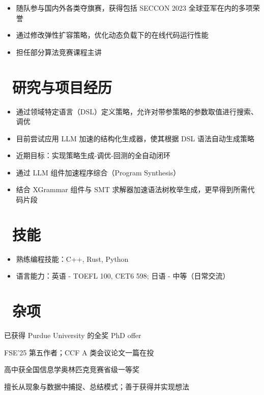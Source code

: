 \documentclass{compact_resume}
\begin{document}
\begin{itemize}[parsep=0.5ex]
  \item 随队参与国内外各类夺旗赛，获得包括 SECCON 2023 全球亚军在内的多项荣誉
\end{itemize}

\begin{itemize}[parsep=0.5ex]
  \item 通过修改弹性扩容策略，优化动态负载下的在线代码运行性能
  \item 担任部分算法竞赛课程主讲
\end{itemize}

\section{\faCogs\ 研究与项目经历}

\begin{itemize}[parsep=0.5ex]
  \item 通过领域特定语言（DSL）定义策略，允许对带参策略的参数取值进行搜索、调优
  \item 目前尝试应用 LLM 加速的结构化生成器，使其根据 DSL 语法自动生成策略
  \item 近期目标：实现策略生成-调优-回测的全自动闭环
\end{itemize}

\begin{itemize}[parsep=0.5ex]
  \item 通过 LLM 组件加速程序综合（Program Synthesis）
  \item 结合 XGrammar 组件与 SMT 求解器加速语法树枚举生成，更早得到所需代码片段
\end{itemize}

\section{\faCogs\ 技能}
\begin{itemize}[parsep=0.5ex]
  \item 熟练编程技能：C++, Rust, Python
  \item 语言能力：英语 - TOEFL 100, CET6 598; 日语 - 中等（日常交流）
\end{itemize}

\section{\faInfo\ 杂项}
\begin{description}[parsep=0.5ex]
  \item[升学] 已获得 Purdue University 的全奖 PhD offer
  \item[论文] FSE'25 第五作者；CCF A 类会议论文一篇在投
  \item[竞赛] 高中获全国信息学奥林匹克竞赛省级一等奖
  \item[特长] 擅长从现象与数据中捕捉、总结模式；善于获得并实现想法
\end{description}
\end{document}
